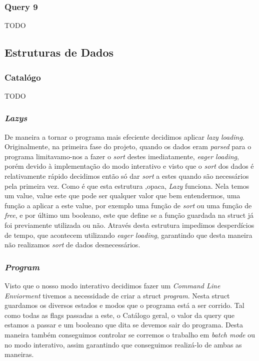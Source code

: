 \documentclass{article}
\begin{document}
        \subsubsection{Query 9}
            TODO
    \subsection{Estruturas de Dados}
        \subsubsection{Catalógo}
            TODO
        \subsubsection{\emph{Lazys}}
            De maneira a tornar o programa mais efeciente decidimos aplicar 
            \emph{lazy loading}. Originalmente, na primeira fase do projeto,
            quando os dados eram \emph{parsed} para o programa limitavamo-nos a 
            fazer o \emph{sort} destes imediatamente, \emph{eager loading}, porém devido à 
            implementação do modo interativo e visto que o \emph{sort} dos dados é relativamente 
            rápido decidimos então só dar \emph{sort} a estes quando são necessários pela primeira 
            vez. Como é que esta estrutura ,opaca, \emph{Lazy} funciona. Nela temos um value, value 
            este que pode ser qualquer valor que bem entendermos, uma função a aplicar a este value, 
            por exemplo uma função de \emph{sort} ou uma função de \emph{free}, e por último um booleano, 
            este que define se a função guardada na struct já foi previamente utilizada ou não. 
            Através desta estrutura impedimos desperdícios de tempo, que acontecem utilizando 
            \emph{eager loading}, garantindo que desta maneira não realizamos \emph{sort} de dados 
            desnecessários.
        \subsubsection{\emph{Program}}
            Visto que o nosso modo interativo decidimos fazer um \emph{Command Line Enviorment} tivemos
            a necessidade de criar a struct \emph{program}. Nesta struct guardamos os diversos estados e
            modos que o programa está a ser corrido. Tal como todas as flags passadas a este, o Catálogo 
            geral, o valor da query que estamos a passar e um booleano que dita se devemos sair do programa.
            Desta maneira também conseguimos controlar se corremos o trabalho em \emph{batch mode} ou no 
            modo interativo, assim garantindo que conseguimos realizá-lo de ambas as maneiras.
\end{document}
